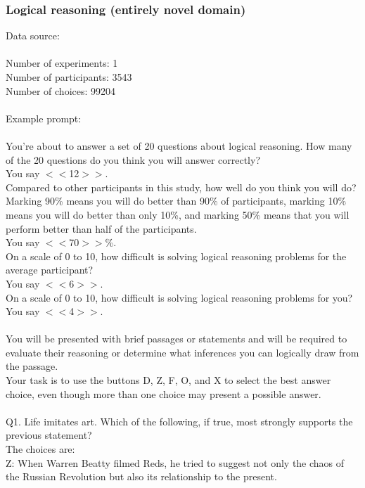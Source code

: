 \documentclass[pdflatex,sn-nature]{sn-jnl}%
\theoremstyle{thmstyleone}%
\theoremstyle{thmstyletwo}%
\theoremstyle{thmstylethree}%
\begin{document}
\subsubsection*{Logical reasoning (entirely novel domain)}

Data source: \cite{jansen2021rational} \\ $~$ \\
Number of experiments: 1 $~$\\ 
Number of participants: 3543 $~$\\ 
Number of choices: 99204 $~$\\ 
 $~$\\ 
Example prompt: $~$\\ 
 $~$\\ 
 You're about to answer a set of 20 questions about logical reasoning. How many of the 20 questions do you think you will answer correctly? $~$\\ 
You say $<<$12$>>$. $~$\\ 
Compared to other participants in this study, how well do you think you will do? Marking 90\% means you will do better than 90\% of participants, marking 10\% means you will do better than only 10\%, and marking 50\% means that you will perform better than half of the participants. $~$\\ 
You say $<<$70$>>$\%. $~$\\ 
On a scale of 0 to 10, how difficult is solving logical reasoning problems for the average participant? $~$\\ 
You say $<<$6$>>$. $~$\\ 
On a scale of 0 to 10, how difficult is solving logical reasoning problems for you? $~$\\ 
You say $<<$4$>>$. $~$\\ 
 $~$\\ 
You will be presented with brief passages or statements and will be required to evaluate their reasoning or determine what inferences you can logically draw from the passage. $~$\\ 
Your task is to use the buttons D, Z, F, O, and X to select the best answer choice, even though more than one choice may present a possible answer. $~$\\ 
 $~$\\ 
Q1. Life imitates art. Which of the following, if true, most strongly supports the previous statement? $~$\\ 
The choices are: $~$\\ 
Z: When Warren Beatty filmed Reds, he tried to suggest not only the chaos of the Russian Revolution but also its relationship to the present. $~$\\ 
\end{document}
